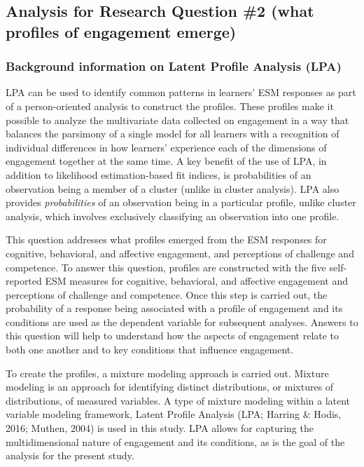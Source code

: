 \documentclass[]{msu-thesis}
\theoremstyle{definition}
\theoremstyle{definition}
\theoremstyle{definition}
\theoremstyle{remark}
\begin{document}
\subsection{Analysis for Research Question \#2 (what profiles of
engagement
emerge)}\label{analysis-for-research-question-2-what-profiles-of-engagement-emerge}

\subsubsection{Background information on Latent Profile Analysis
(LPA)}\label{background-information-on-latent-profile-analysis-lpa}

LPA can be used to identify common patterns in learners' ESM responses
as part of a person-oriented analysis to construct the profiles. These
profiles make it possible to analyze the multivariate data collected on
engagement in a way that balances the parsimony of a single model for
all learners with a recognition of individual differences in how
learners' experience each of the dimensions of engagement together at
the same time. A key benefit of the use of LPA, in addition to
likelihood estimation-based fit indices, is probabilities of an
observation being a member of a cluster (unlike in cluster analysis).
LPA also provides \emph{probabilities} of an observation being in a
particular profile, unlike cluster analysis, which involves exclusively
classifying an observation into one profile.

This question addresses what profiles emerged from the ESM responses for
cognitive, behavioral, and affective engagement, and perceptions of
challenge and competence. To answer this question, profiles are
constructed with the five self-reported ESM measures for cognitive,
behavioral, and affective engagement and perceptions of challenge and
competence. Once this step is carried out, the probability of a response
being associated with a profile of engagement and its conditions are
used as the dependent variable for subsequent analyses. Answers to this
question will help to understand how the aspects of engagement relate to
both one another and to key conditions that influence engagement.

To create the profiles, a mixture modeling approach is carried out.
Mixture modeling is an approach for identifying distinct distributions,
or mixtures of distributions, of measured variables. A type of mixture
modeling within a latent variable modeling framework, Latent Profile
Analysis (LPA; Harring \& Hodis, 2016; Muthen, 2004) is used in this
study. LPA allows for capturing the multidimensional nature of
engagement and its conditions, as is the goal of the analysis for the
present study.
\end{document}
